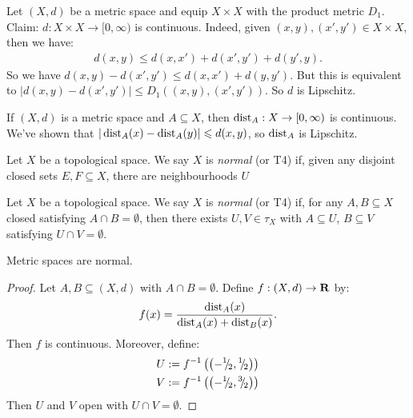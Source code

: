     \begin{example}
        Let $(X,d)$ be a metric space and equip $X \times X$ with the product metric $D_1$. Claim: $d:X \times X \rightarrow [0,\infty)$ is continuous. Indeed, given $(x,y),(x',y') \in X \times X$, then we have:
            \begin{equation*}
            \begin{split}
                d(x,y) \leq d(x,x') + d(x',y') + d(y',y).
            \end{split}
            \end{equation*}
        So we have $d(x,y) - d(x',y') \leq d(x,x') + d(y,y')$. But this is equivalent to $|d(x,y) - d(x',y')| \leq D_1((x,y),(x',y'))$. So $d$ is Lipschitz.
    \end{example}

    \begin{example}
        If $(X,d)$ is a metric space and $A \subseteq X$, then $\operatorname{dist}_A : X \rightarrow [0,\infty)$ is continuous. We've shown that $|\operatorname{dist}_A(x) - \operatorname{dist}_A(y)| \leqslant d(x,y)$, so $\operatorname{dist}_A$ is Lipschitz.
    \end{example}

    \begin{definition}
        Let $X$ be a topological space. We say $X$ is \textit{normal} (or T4) if, given any disjoint closed sets $E,F \subseteq X$, there are neighbourhoods $U$
    \end{definition}

    \begin{definition}
        Let $X$ be a topological space. We say $X$ is \textit{normal} (or T4) if, for any $A,B \subseteq X$ closed satisfying $A \cap B = \emptyset$, then there exists $U,V \in \tau_X$ with $A \subseteq U$, $B \subseteq V$ satisfying $U \cap V = \emptyset$.
    \end{definition}

    \begin{proposition}
        Metric spaces are normal.
    \end{proposition}
        \begin{proof}
            Let $A,B \subseteq (X,d)$ with $A \cap B = \emptyset$. Define $f:(X,d) \rightarrow \mathbf{R}$ by:
                \begin{equation*}
                \begin{split}
                    f(x) = \frac{\operatorname{dist}_A(x)}{\operatorname{dist}_A(x) + \operatorname{dist}_B(x)}.
                \end{split}
                \end{equation*}
            Then $f$ is continuous. Moreover, define:
                \begin{equation*}
                \begin{split}
                    U &:= f^{-1}\left(\left(-{}^{1}\mskip -5mu/\mskip -3mu_{2},{}^{1}\mskip -5mu/\mskip -3mu_{2}\right)\right) \\
                    V &:= f^{-1}\left(\left(-{}^{1}\mskip -5mu/\mskip -3mu_{2},{}^{3}\mskip -5mu/\mskip -3mu_{2}\right)\right)
                \end{split}
                \end{equation*}
            Then $U$ and $V$ open with $U \cap V = \emptyset$.
        \end{proof}

